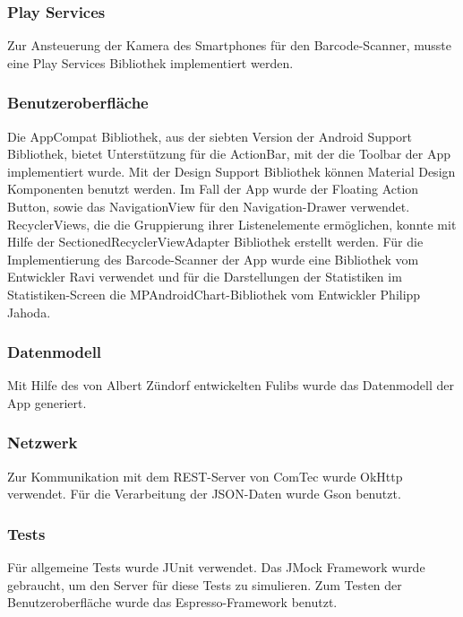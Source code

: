 \subsubsection{Play Services} \label{subsubsec:play-service-libraries}
Zur Ansteuerung der Kamera des Smartphones für den Barcode-Scanner, musste eine Play Services Bibliothek implementiert werden.

\subsubsection{Benutzeroberfläche} \label{subsubsec:ui-libraries}
Die AppCompat Bibliothek, aus der siebten Version der Android Support Bibliothek, bietet Unterstützung für die ActionBar, mit der die Toolbar der App implementiert wurde.
Mit der Design Support Bibliothek können Material Design Komponenten benutzt werden.
Im Fall der App wurde der Floating Action Button, sowie das NavigationView für den Navigation-Drawer verwendet.
RecyclerViews, die die Gruppierung ihrer Listenelemente ermöglichen, konnte mit Hilfe der SectionedRecyclerViewAdapter Bibliothek erstellt werden.
Für die Implementierung des Barcode-Scanner der App wurde eine Bibliothek vom Entwickler Ravi verwendet und für die Darstellungen der Statistiken im Statistiken-Screen die MPAndroidChart-Bibliothek vom Entwickler Philipp Jahoda.

\subsubsection{Datenmodell} \label{subsubsec:model-libraries}
Mit Hilfe des von Albert Zündorf entwickelten Fulibs wurde das Datenmodell der App generiert.

\subsubsection{Netzwerk} \label{subsubsec:network-libraries}
Zur Kommunikation mit dem REST-Server von ComTec wurde OkHttp verwendet.
Für die Verarbeitung der JSON-Daten wurde Gson benutzt.

\subsubsection{Tests} \label{subsubsec:tests-libraries}
Für allgemeine Tests wurde JUnit verwendet.
Das JMock Framework wurde gebraucht, um den Server für diese Tests zu simulieren.
Zum Testen der Benutzeroberfläche wurde das Espresso-Framework benutzt.
